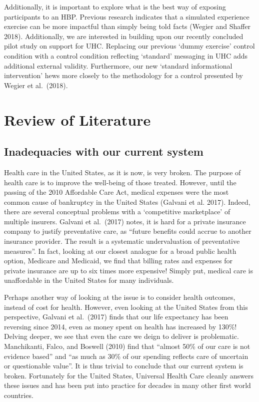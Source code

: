 \documentclass[
]{article}
\begin{document}
Additionally, it is important to explore what is the best way of
exposing participants to an HBP. Previous research indicates that a
simulated experience exercise can be more impactful than simply being
told facts (Wegier and Shaffer 2018). Additionally, we are interested in
building upon our recently concluded pilot study on support for UHC.
Replacing our previous `dummy exercise' control condition with a control
condition reflecting `standard' messaging in UHC adds additional
external validity. Furthermore, our new `standard informational
intervention' hews more closely to the methodology for a control
presented by Wegier et al.~(2018).

\hypertarget{review-of-literature}{%
\section{Review of Literature}\label{review-of-literature}}

\hypertarget{inadequacies-with-our-current-system}{%
\subsection{Inadequacies with our current
system}\label{inadequacies-with-our-current-system}}

Health care in the United States, as it is now, is very broken. The
purpose of health care is to improve the well-being of those treated.
However, until the passing of the 2010 Affordable Care Act, medical
expenses were the most common cause of bankruptcy in the United States
(Galvani et al. 2017). Indeed, there are several conceptual problems
with a `competitive marketplace' of multiple insurers. Galvani et
al.~(2017) notes, it is hard for a private insurance company to justify
preventative care, as ``future benefits could accrue to another
insurance provider. The result is a systematic undervaluation of
preventative measures''. In fact, looking at our closest analogue for a
broad public health option, Medicare and Medicaid, we find that billing
rates and expenses for private insurance are up to six times more
expensive! Simply put, medical care is unaffordable in the United States
for many individuals.

Perhaps another way of looking at the issue is to consider health
outcomes, instead of cost for health. However, even looking at the
United States from this perspective, Galvani et al.~(2017) finds that
our life expectancy has been reversing since 2014, even as money spent
on health has increased by 130\%! Delving deeper, we see that even the
care we deign to deliver is problematic. Manchikanti, Falco, and Boswell
(2010) find that ``almost 50\% of our care is not evidence based'' and
``as much as 30\% of our spending reflects care of uncertain or
questionable value''. It is thus trivial to conclude that our current
system is broken. Fortunately for the United States, Universal Health
Care cleanly answers these issues and has been put into practice for
decades in many other first world countries.
\end{document}
